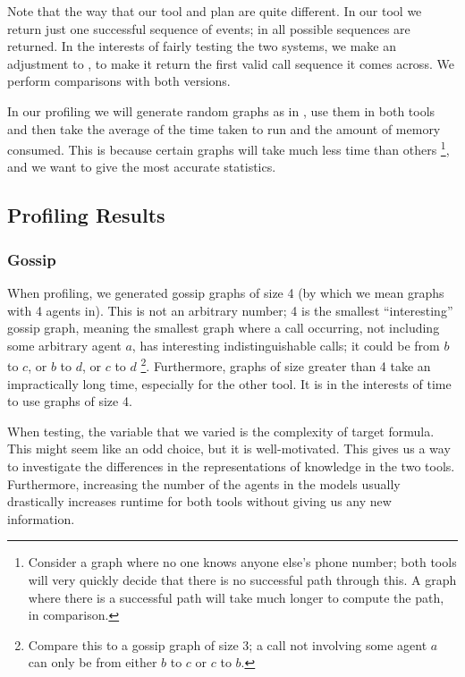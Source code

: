 \documentclass[ %
                    author={Leo Poulson},
                supervisor={Dr. Steven Ramsay},
                    degree={BSc},
                     title={Epistemic Planning for the Dynamic Gossip problem},
                  subtitle={},
                      year={2019} ]{dissertation}
\begin{document}
Note that the way that our tool and \cite{GithubGossip} plan are quite
different. In our tool we return just one successful sequence of events; in
\cite{GithubGossip} all possible sequences are returned. In the interests of
fairly testing the two systems, we make an adjustment to \cite{GithubGossip}, to
make it return the first valid call sequence it comes across. We perform
comparisons with both versions.

In our profiling we will generate random graphs as in
, use them in both tools and then take the average
of the time taken to run and the amount of memory consumed. This is because
certain graphs will take much less time than others \footnote{Consider a graph
  where no one knows anyone else's phone number; both tools will very quickly
  decide that there is no successful path through this. A graph where there is a
  successful path will take much longer to compute the path, in comparison.},
and we want to give the most accurate statistics.

\subsection{Profiling Results}

\subsubsection{Gossip}

When profiling, we generated gossip graphs of size 4 (by which we mean graphs
with 4 agents in). This is not an arbitrary number; 4 is the smallest
``interesting'' gossip graph, meaning the smallest graph where a call occurring,
not including some arbitrary agent $a$, has interesting indistinguishable calls;
it could be from $b$ to $c$, or $b$ to $d$, or $c$ to $d$ \footnote{Compare this
  to a gossip graph of size 3; a call not involving some agent $a$ can only be
  from either $b$ to $c$ or $c$ to $b$.}. Furthermore, graphs of size greater
than 4 take an impractically long time, especially for the other tool. It is in
the interests of time to use graphs of size 4.

When testing, the variable that we varied is the complexity of target formula.
This might seem like an odd choice, but it is well-motivated. This gives us
a way to investigate the differences in the representations of knowledge in the
two tools. Furthermore, increasing the number of the agents in the models
usually drastically increases runtime for both tools without giving us any new
information.
\end{document}
